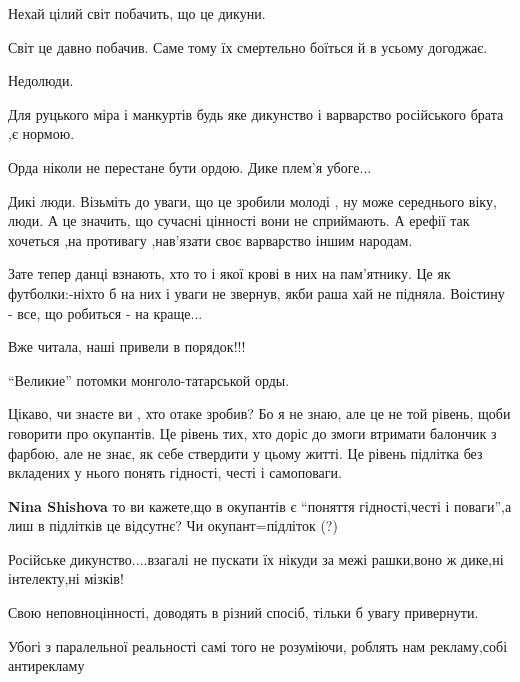 \begin{itemize}
Нехай цілий світ побачить, що це дикуни.

Світ це давно побачив. Саме тому їх смертельно боїться й в усьому догоджає.

Недолюди.


Для руцького міра і манкуртів будь яке дикунство і варварство російського брата ,є нормою.


Орда ніколи не перестане бути ордою. Дике плем'я убоге...


Дикі люди. Візьміть до уваги, що це зробили молоді , ну може середнього віку,
люди. А це значить, що сучасні цінності вони не сприймають. А ерефії так
хочеться ,на противагу ,нав'язати своє варварство іншим народам.


Зате тепер данці взнають, хто то і якої крові в них на пам'ятнику. Це як
футболки:-ніхто б на них і уваги не звернув, якби раша хай не підняла. Воістину
- все, що робиться - на краще...

Вже читала, наші привели в порядок!!!


\enquote{Великие} потомки монголо-татарськой орды.


Цікаво, чи знаєте ви , хто отаке зробив? Бо я не знаю, але це не той рівень,
щоби говорити про окупантів. Це рівень тих, хто доріс до змоги втримати
балончик з фарбою, але не знає, як себе ствердити у цьому житті. Це рівень
підлітка без вкладених у нього понять гідності, честі і самоповаги.


\textbf{Nina Shishova} то ви кажете,що в окупантів є \enquote{поняття
гідності,честі і поваги},а лиш в підлітків це відсутнє?  Чи окупант=підліток
(?)

Російське дикунство....взагалі не пускати їх нікуди за межі рашки,воно ж дике,ні інтелекту,ні мізків!

Свою неповноцінності, доводять в різний спосіб, тільки б увагу привернути.


Убогі з паралельної реальності самі того не розуміючи, роблять нам рекламу,собі антирекламу


\end{itemize}
